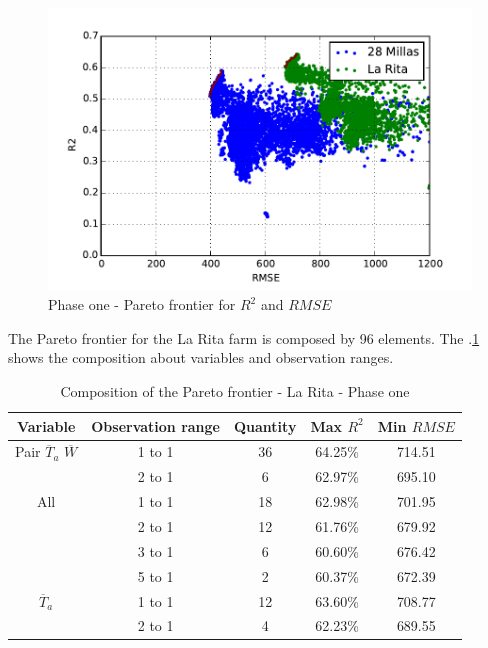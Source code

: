 \documentclass[review,authoryear,english]{elsarticle}
\begin{document}
\begin{figure}[H] 
 \centering
 \includegraphics[scale=.8]{Phase_one_R2_RMSE}
 \caption{Phase one - Pareto frontier for $R^2$ and $RMSE$} 
 \label{figura7} 
\end{figure}

The Pareto frontier for the La Rita farm is composed by 96 elements. The \tablename $.$\ref{tabla2} shows the composition about variables and observation ranges.

\begin{table}[h] 
\caption{Composition of the Pareto frontier - La Rita - Phase one} 
\label{tabla2} 
\centering
\begin{tabular}{c|c|c|c|c} 
\hline
\bfseries Variable & \bfseries Observation range & \bfseries Quantity & \bfseries Max $R^2$ & \bfseries Min $RMSE$\\ 
\hline\hline 
Pair $\overline{T}_{a}$ $\overline{W}$ &	1 to 1  & 36 & 64.25\% & 714.51 \\
 &	2 to 1  & 6 & 62.97\% & 695.10 \\
\hline 
All  & 1 to 1  & 18 & 62.98\% & 701.95 \\
   & 2 to 1  & 12 & 61.76\% & 679.92 \\
    & 3 to 1  & 6 & 60.60\% & 676.42 \\
    & 5 to 1  &  2 & 60.37\% & 672.39 \\
\hline    
$\overline{T}_{a}$ & 1 to 1  & 12  & 63.60\% & 708.77 \\
       &	2 to 1  & 4 & 62.23\% & 689.55 \\
\hline
\end{tabular} 
\end{table}
\end{document}
